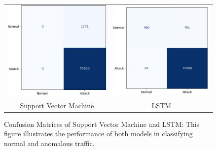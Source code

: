 \documentclass[pdflatex,sn-mathphys-num]{sn-jnl}
\theoremstyle{thmstyleone}
\theoremstyle{thmstyletwo}
\theoremstyle{thmstylethree}
\begin{document}
\begin{figure}[H]
    \centering
    \begin{tabular}{cc}
        \includegraphics[width=0.5\linewidth]{support vector Machine.png} &
        \includegraphics[width=0.5\linewidth]{LSTM.png} \\
        \small Support Vector Machine & \small LSTM
    \end{tabular}
    \caption{Confusion Matrices of Support Vector Machine and LSTM:
This figure illustrates the performance of both models in classifying normal and anomalous traffic.}
    \label{fig:confusion_matrices_svm_lstm}
\end{figure}
\end{document}
